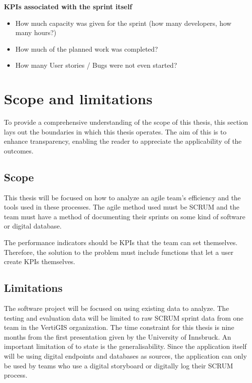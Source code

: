 \textbf{KPIs associated with the sprint itself}

\begin{itemize}
    \item How much capacity was given for the sprint (how many developers, how many hours?)
    \item How much of the planned work was completed?
    \item How many User stories / Bugs were not even started?
\end{itemize}

\section{Scope and limitations}

To provide a comprehensive understanding of the scope of this thesis, 
this section lays out the boundaries in which this thesis operates. 
The aim of this is to enhance transparency, enabling the reader to appreciate the applicability of the outcomes.

\subsection{Scope}

This thesis will be focused on how to analyze an agile team's efficiency and the tools used in these processes. 
The agile method used must be SCRUM and the team must have a method of documenting 
their sprints on some kind of software or digital database. 

The performance indicators should be KPIs that the team can set themselves. 
Therefore, the solution to the problem must include functions that let a user create KPIs themselves.

\subsection{Limitations}

The software project will be focused on using existing data to analyze. 
The testing and evaluation data will be limited to raw SCRUM sprint data from one team in the VertiGIS organization.
The time constraint for this thesis is nine months from the first presentation given by the University of Innsbruck. 
An important limitation of to state is the generalisability. Since the application itself will be using digital endpoints 
and databases as sources, the application can only be used by teams who use a digital storyboard or digitally log their SCRUM process.


